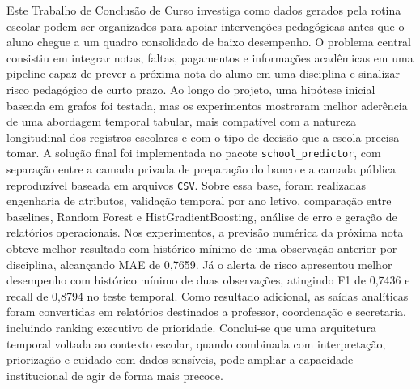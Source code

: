 
\begin{resumo}
Este Trabalho de Conclus\~ao de Curso investiga como dados gerados pela rotina escolar podem ser organizados para apoiar interven\c{c}\~oes pedag\'ogicas antes que o aluno chegue a um quadro consolidado de baixo desempenho. O problema central consistiu em integrar notas, faltas, pagamentos e informa\c{c}\~oes acad\^emicas em uma pipeline capaz de prever a pr\'oxima nota do aluno em uma disciplina e sinalizar risco pedag\'ogico de curto prazo. Ao longo do projeto, uma hip\'otese inicial baseada em grafos foi testada, mas os experimentos mostraram melhor ader\^encia de uma abordagem temporal tabular, mais compat\'ivel com a natureza longitudinal dos registros escolares e com o tipo de decis\~ao que a escola precisa tomar. A solu\c{c}\~ao final foi implementada no pacote \texttt{school\_predictor}, com separa\c{c}\~ao entre a camada privada de prepara\c{c}\~ao do banco e a camada p\'ublica reproduz\'ivel baseada em arquivos \texttt{CSV}. Sobre essa base, foram realizadas engenharia de atributos, valida\c{c}\~ao temporal por ano letivo, compara\c{c}\~ao entre baselines, Random Forest e HistGradientBoosting, an\'alise de erro e gera\c{c}\~ao de relat\'orios operacionais. Nos experimentos, a previs\~ao num\'erica da pr\'oxima nota obteve melhor resultado com hist\'orico m\'inimo de uma observa\c{c}\~ao anterior por disciplina, alcan\c{c}ando MAE de 0,7659. J\'a o alerta de risco apresentou melhor desempenho com hist\'orico m\'inimo de duas observa\c{c}\~oes, atingindo F1 de 0,7436 e recall de 0,8794 no teste temporal. Como resultado adicional, as sa\'idas anal\'iticas foram convertidas em relat\'orios destinados a professor, coordena\c{c}\~ao e secretaria, incluindo ranking executivo de prioridade. Conclui-se que uma arquitetura temporal voltada ao contexto escolar, quando combinada com interpreta\c{c}\~ao, prioriza\c{c}\~ao e cuidado com dados sens\'iveis, pode ampliar a capacidade institucional de agir de forma mais precoce.
\end{resumo}
